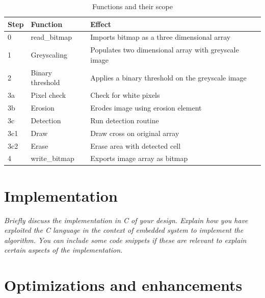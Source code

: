 \documentclass[a4paper, english]{article}
\numberwithin{equation}{section}
\begin{document}
\begin{table}
    \centering
    \caption{Functions and their scope}\label{tbl:func}
    \begin{tabular}{lll}
        \toprule
        Step & Function         & Effect                                               \\
        \midrule
        0    & read\_bitmap     & Imports bitmap as a three dimensional array          \\
        1    & Greyscaling      & Populates two dimensional array with greyscale image \\
        2    & Binary threshold & Applies a binary threshold on the greyscale image    \\
        3a   & Pixel check      & Check for white pixels                               \\
        3b   & Erosion          & Erodes image using erosion element                   \\
        3c   & Detection        & Run detection routine                                \\
        3c1  & Draw             & Draw cross on original array                         \\
        3c2  & Erase            & Erase area with detected cell                        \\
        4    & write\_bitmap    & Exports image array as bitmap                        \\
        \bottomrule
    \end{tabular}
\end{table}
\section{Implementation}\label{sec:implementation}
\textit{Briefly discuss the implementation in C of your design. Explain how you have exploited the C language in the context of embedded system to implement the algorithm. You can include some code snippets if these are relevant to explain certain aspects of the implementation.}
\section{Optimizations and enhancements}
\end{document}
